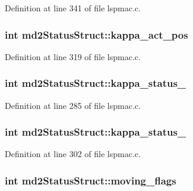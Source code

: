 Definition at line 341 of file lspmac.\-c.

\hypertarget{structmd2StatusStruct_ac384fb7073387dd5dcb2e85a00ec8a77}{
\subsubsection[{kappa\-\_\-act\-\_\-pos}]{\setlength{\rightskip}{0pt plus 5cm}int md2\-Status\-Struct\-::kappa\-\_\-act\-\_\-pos}}\label{structmd2StatusStruct_ac384fb7073387dd5dcb2e85a00ec8a77}


Definition at line 319 of file lspmac.\-c.

\hypertarget{structmd2StatusStruct_ab152694bc32d37c1d180f55e8d282020}{
\subsubsection[{kappa\-\_\-status\-\_\-1}]{\setlength{\rightskip}{0pt plus 5cm}int md2\-Status\-Struct\-::kappa\-\_\-status\-\_}}\label{structmd2StatusStruct_ab152694bc32d37c1d180f55e8d282020}


Definition at line 285 of file lspmac.\-c.

\hypertarget{structmd2StatusStruct_af6891f5f8dcfc62668f64c583042c6bc}{
\subsubsection[{kappa\-\_\-status\-\_\-2}]{\setlength{\rightskip}{0pt plus 5cm}int md2\-Status\-Struct\-::kappa\-\_\-status\-\_}}\label{structmd2StatusStruct_af6891f5f8dcfc62668f64c583042c6bc}


Definition at line 302 of file lspmac.\-c.

\hypertarget{structmd2StatusStruct_aac82f8e97fa39ea9be7823dd1d308986}{
\subsubsection[{moving\-\_\-flags}]{\setlength{\rightskip}{0pt plus 5cm}int md2\-Status\-Struct\-::moving\-\_\-flags}}\label{structmd2StatusStruct_aac82f8e97fa39ea9be7823dd1d308986}


